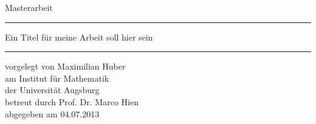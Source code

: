 
\begin{titlepage}
  \thispagestyle{empty}
  \newcommand{\Rule}{%
    \textcolor{black}{\rule{\textwidth}{0.5mm}}%
  }
  \begin{center}\sffamily
    \normalfont\sffamily\large
    Masterarbeit
    \Rule
    \vspace{5mm}
    \Huge{Ein Titel für meine Arbeit soll hier sein}
    \vspace{1mm}
    \Rule
  \end{center}
    \normalfont\sffamily\large vorgelegt von \Large Maximilian Huber\\
    \normalfont\sffamily\large am            \Large Institut für Mathematik\\
    \normalfont\sffamily\large der           \Large Universität Augsburg\\
    \normalfont\sffamily\large betreut durch \Large Prof. Dr. Marco Hien\\
    \normalfont\sffamily\large abgegeben am  \Large 04.07.2013\\
    \vfill
    \vfill
\end{titlepage}

